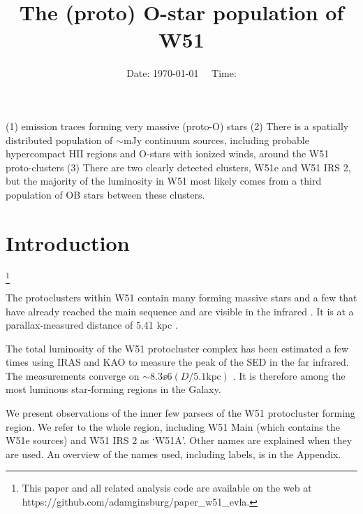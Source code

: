 



\title{The (proto) O-star population of W51}


\date{Date: \today ~~ Time: \currenttime}

\abstract
{}
{}
{}
{}
{
(1) \ortho \twotwo emission traces forming very massive (proto-O) stars
(2) There is a spatially distributed population of $\sim$mJy continuum sources,
including probable hypercompact HII regions and O-stars with ionized winds,
around the W51 proto-clusters
(3) There are two clearly detected clusters, W51e and W51 IRS 2, but the
majority of the luminosity in W51 most likely comes from a third population of
OB stars between these clusters.
}

\maketitle


\section{Introduction}
\footnote{
This paper and all related analysis code are available on the web at
https://github.com/adamginsburg/paper\_w51\_evla.
}


The protoclusters within W51 contain many forming massive stars
\citep{Zhang1997a,Keto2008b,Zapata2008a,Zapata2009a,Zapata2010a,Shi2010b,Shi2010a,Goddi2015a}
and a few that have already reached the main sequence and are visible in the
infrared \citep{Goldader1994a,Okumura2000a,Kumar2004a,Barbosa2008a,Figueredo2008a}.
It is at a parallax-measured distance of 5.41 kpc \citep{Sato2010a,Xu2009a}.

The total luminosity of the W51 protocluster complex has been estimated a few
times using IRAS and KAO to measure the peak of the SED in the far infrared.
The measurements converge on $\sim8.3\ee{6} (D/5.1\mathrm{kpc})$ \lsun
\citep{Harvey1986a,Sievers1991a}.  It is therefore among the most luminous
star-forming regions in the Galaxy.

We present observations of the inner few parsecs of the W51 protocluster
forming region.  We refer to the whole region, including W51 Main (which
contains the W51e sources) and W51 IRS 2 as `W51A'.  Other names are explained
when they are used.  An overview of the names used, including labels, is in the
Appendix.

